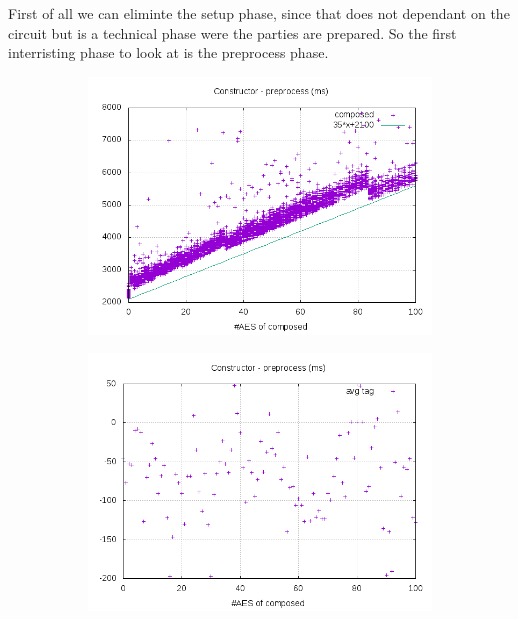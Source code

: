 \documentclass[10pt,a4paper]{article}
\begin{document}
First of all we can eliminte the setup phase, since that does not dependant on the circuit but is a technical phase were the parties are prepared. So the first interristing phase to look at is the preprocess phase.

\begin{figure}[h]
    \centering
    \begin{subfigure}[t]{0.3\textwidth}
        \includegraphics[width=\textwidth]{const_preprocess_plots}
        \caption{}
        \label{preprocess composed}
    \end{subfigure}
    \begin{subfigure}[t]{0.3\textwidth}
        \includegraphics[width=\textwidth]{const_preprocess_avg}

\end{subfigure}
\end{figure}
\end{document}
